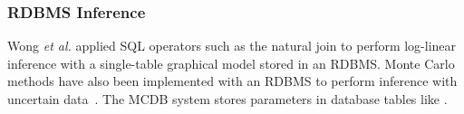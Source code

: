 \subsubsection{RDBMS Inference}
Wong {\em et al.}  applied SQL operators such as the natural join to perform log-linear inference with a single-table graphical model \cite{Wong1995} stored in an RDBMS. 
Monte Carlo methods have also been implemented with an RDBMS  to perform inference with uncertain data~\cite{MCDB_SIGMOD_2008,Wick_VLDB_2010}.
The MCDB system \cite{MCDB_SIGMOD_2008}  stores parameters in database tables like \FB. 
%






